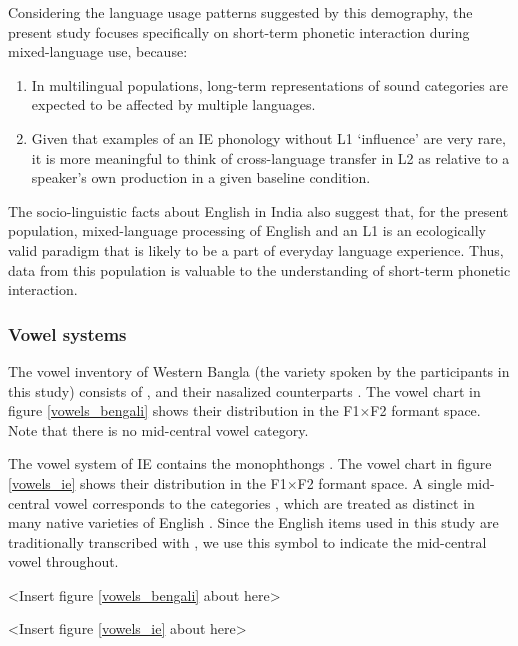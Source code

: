 \documentclass[12 pt]{article}
\newcommand{\nt}[1]{\textipa{[#1]}} %
\begin{document}
Considering the language usage patterns suggested by this demography, the present study focuses specifically on short-term phonetic interaction during mixed-language use, because:

\begin{enumerate}[label=(\roman*)]
	\item In multilingual populations, long-term representations of sound categories are expected to be affected by multiple languages. 
	\item Given that examples of an IE phonology without L1 `influence' are very rare, it is more meaningful to think of cross-language transfer in L2 as relative to a speaker's own production in a given baseline condition.
\end{enumerate}

The socio-linguistic facts about English in India also suggest that, for the present population, mixed-language processing of English and an L1 is an ecologically valid paradigm that is likely to be a part of everyday language experience. Thus, data from this population is valuable to the understanding of short-term phonetic interaction.

\subsubsection*{Vowel systems} \label{vowel systems}
The vowel inventory of Western Bangla (the variety spoken by the participants in this study) consists of \nt{i, e, \ae, a, O, o, u}, and their nasalized counterparts \citep{garry2001facts}. The vowel chart in figure \ref{vowels_bengali} shows their distribution in the F1$\times$F2 formant space. Note that there is no mid-central vowel category. 


The vowel system of IE contains the monophthongs \nt{I, i, E, e, \ae, @/2/3:, a:, O, o, U, u} \citep{wells1982accents, masica1972sound}. The vowel chart in figure \ref{vowels_ie} shows their distribution in the F1$\times$F2 formant space. 
A single mid-central vowel corresponds to the categories \nt{2,@,3:}, which are treated as distinct in many native varieties of English \citep{nihalani1979indian,wells1982accents,hickey2005legacies,bansal1969intelligibility}. Since the English items used in this study are traditionally transcribed with \nt{2}, we use this symbol to indicate the mid-central vowel throughout. 
 
<Insert figure \ref{vowels_bengali} about here>

<Insert figure \ref{vowels_ie} about here>
\end{document}
